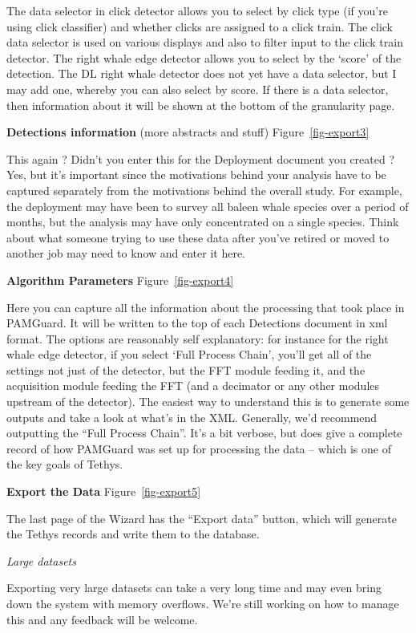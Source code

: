 \documentclass[
]{article}
\begin{document}
The data selector in click detector allows you to select by click type
(if you're using click classifier) and whether clicks are assigned to a
click train. The click data selector is used on various displays and
also to filter input to the click train detector. The right whale edge
detector allows you to select by the `score' of the detection. The DL
right whale detector does not yet have a data selector, but I may add
one, whereby you can also select by score. If there is a data selector,
then information about it will be shown at the bottom of the granularity
page.

\textbf{Detections information} (more abstracts and stuff)
Figure~\ref{fig-export3}

This again ? Didn't you enter this for the Deployment document you
created ? Yes, but it's important since the motivations behind your
analysis have to be captured separately from the motivations behind the
overall study. For example, the deployment may have been to survey all
baleen whale species over a period of months, but the analysis may have
only concentrated on a single species. Think about what someone trying
to use these data after you've retired or moved to another job may need
to know and enter it here.

\textbf{Algorithm Parameters} Figure~\ref{fig-export4}

Here you can capture all the information about the processing that took
place in PAMGuard. It will be written to the top of each Detections
document in xml format. The options are reasonably self explanatory: for
instance for the right whale edge detector, if you select `Full Process
Chain', you'll get all of the settings not just of the detector, but the
FFT module feeding it, and the acquisition module feeding the FFT (and a
decimator or any other modules upstream of the detector). The easiest
way to understand this is to generate some outputs and take a look at
what's in the XML. Generally, we'd recommend outputting the ``Full
Process Chain''. It's a bit verbose, but does give a complete record of
how PAMGuard was set up for processing the data -- which is one of the
key goals of Tethys.

\textbf{Export the Data} Figure~\ref{fig-export5}

The last page of the Wizard has the ``Export data'' button, which will
generate the Tethys records and write them to the database.

\emph{Large datasets}

Exporting very large datasets can take a very long time and may even
bring down the system with memory overflows. We're still working on how
to manage this and any feedback will be welcome.
\end{document}
